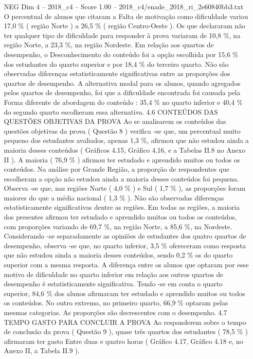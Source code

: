 \begin{textsample}{NEG Dim 4 – 2018\_c4 – Score 1.00 – 2018\_c4/enade\_2018\_ri\_2e60840bb3.txt}
O percentual de alunos que citaram a Falta de motivação como dificuldade variou 17,0 \% ( região Norte ) a 26,5 \% ( região Centro-Oeste ).
Os que declararam não ter qualquer tipo de dificuldade para responder à prova variaram de 10,8 \%, na região Norte, a 23,3 \%, na região Nordeste.
Em relação aos quartos de desempenho, o Desconhecimento do conteúdo foi a opção escolhida por 15,6 \% dos estudantes do quarto superior e por 18,4 \% do terceiro quarto.
Não são observadas diferenças estatisticamente significativas entre as proporções dos quartos de desempenho.
A alternativa modal para os alunos, quando agregados pelos quartos de desempenho, foi que a dificuldade encontrada foi causada pela Forma diferente de abordagem do conteúdo : 35,4 \% no quarto inferior e 40,4 \% do segundo quarto escolheram essa alternativa. 4.6 CONTEÚDOS DAS QUESTÕES OBJETIVAS DA PROVA Ao se analisarem os conteúdos das questões objetivas da prova ( Questão 8 ) verifica -se que, um percentual muito pequeno dos estudantes avaliados, apenas 1,3 \%, afirmou que não estudou ainda a maioria desses conteúdos ( Gráficos 4.15, Gráfico 4.16, e a Tabelas II.8 no Anexo II ).
A maioria ( 76,9 \% ) afirmou ter estudado e aprendido muitos ou todos os conteúdos.
Na análise por Grande Região, a proporção de respondentes que escolheram a opção não estudou ainda a maioria desses conteúdos foi pequena.
Observa -se que, nas regiões Norte ( 4,0 \% ) e Sul ( 1,7 \% ), as proporções foram maiores do que a média nacional ( 1,3 \% ).
Não são observadas diferenças estatisticamente significativas dentre as regiões.
Em todas as regiões, a maioria dos presentes afirmou ter estudado e aprendido muitos ou todos os conteúdos, com proporções variando de 69,7 \%, na região Norte, a 85,6 \%, na Nordeste.
Considerando -se separadamente as opiniões de estudantes dos quatro quartos de desempenho, observa -se que, no quarto inferior, 3,5 \% ofereceram como resposta que não estudou ainda a maioria desses conteúdos, sendo 0,2 \% os do quarto superior com a mesma resposta.
A diferença entre os alunos que optaram por esse motivo de dificuldade no quarto inferior em relação aos outros quartos de desempenho é estatisticamente significativa.
Tendo -se em conta o quarto superior, 84,6 \% dos alunos afirmaram ter estudado e aprendido muitos ou todos os conteúdos.
No outro extremo, no primeiro quarto, 66,9 \% optaram pelas mesmas categorias.
As proporções são decrescentes com o desempenho. 4.7 TEMPO GASTO PARA CONCLUIR A PROVA Ao responderem sobre o tempo de conclusão da prova ( Questão 9 ), quase três quartos dos estudantes ( 78,5 \% ) afirmaram ter gasto Entre duas e quatro horas ( Gráfico 4.17, Gráfico 4.18 e, no Anexo II, a Tabela II.9 ).

\end{textsample}
